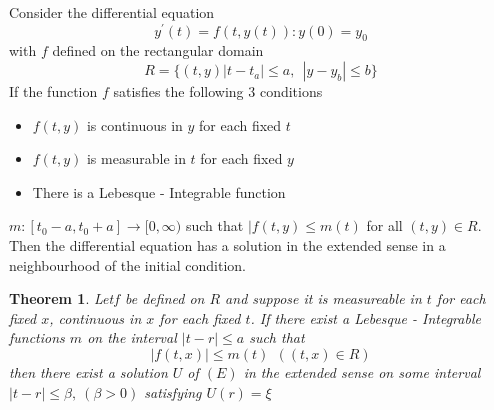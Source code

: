 \documentclass[a4 paper, 12pt]{report}
\theoremstyle{plain}
\newtheorem{theorem}{\textbf{Theorem}}[section]
\begin{document}
Consider the differential equation
$$
y^\prime(t) = f(t,y(t)):y(0) = y_0
$$
with $f$ defined on the rectangular domain
$$
R = \{(t,y)|t - t_a|\leq a,~~|y - y_b|\leq b\}
$$
If the function $f$ satisfies the following 3 conditions
\begin{itemize}
\item $f(t,y)$ is continuous in $y$ for each fixed $t$
\item $f(t,y)$ is measurable in $t$ for each fixed $y$
\item There is a Lebesque - Integrable function
\end{itemize}
$m:[t_0 -a,t_0+a]\rightarrow[0,\infty)$ such that $|f(t,y)\leq m(t)$ for all $(t,y)\in R$.\\
Then the differential equation has a solution in the extended sense in a neighbourhood of the initial condition.
\begin{theorem}
Let$f$ be defined on $R$ and suppose it is measureable in $t$ for each fixed $x$, continuous in $x$ for each fixed $t$. If there exist a Lebesque - Integrable functions $m$ on the interval $|t-r|\leq a$ such that
\begin{equation}\label{2.1.35}
|f(t,x)|\leq m(t)~~((t,x)\in R)
\end{equation}
then there exist a solution $U$ of $(E)$ in the extended sense  on some interval $|t-r|\leq \beta,~(\beta>0)$ satisfying $U(r) = \xi$
\end{theorem}
\end{document}
